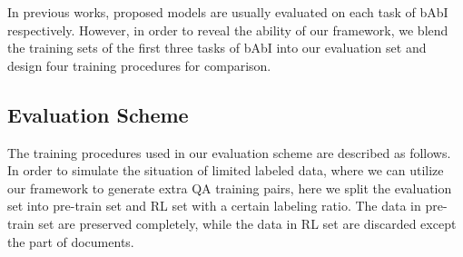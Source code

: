 \documentclass{article}
\begin{document}
In previous works, proposed models are usually evaluated on each task of bAbI respectively. However, in order to reveal the ability of our framework, we blend the training sets of the first three tasks of bAbI into our evaluation set and design four training procedures for comparison.

\subsection{Evaluation Scheme}
The training procedures used in our evaluation scheme are described as follows. In order to simulate the situation of limited labeled data, where we can utilize our framework to generate extra QA training pairs, here we split the evaluation set into pre-train set and RL set with a certain labeling ratio. The data in pre-train set are preserved completely, while the data in RL set are discarded except the part of documents.
\end{document}
